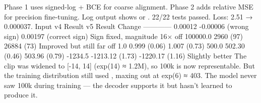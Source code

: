 {}Phase 1 uses signed-log + BCE for coarse alignment. Phase 2 adds relative MSE for precision fine-tuning. Log output shows \markdownRendererCodeSpan{[P1]} or \markdownRendererCodeSpan{[P2]}.\markdownRendererInterblockSeparator
{}\markdownRendererThematicBreak{}\markdownRendererInterblockSeparator
{}
\markdownRendererSectionEnd 
\markdownRendererSectionEnd \markdownRendererSectionBegin
{}\markdownRendererInterblockSeparator
{}\markdownRendererSectionBegin
{}\markdownRendererInterblockSeparator
{}22/22 tests passed. Loss: 2.51 → 0.000037.\markdownRendererParagraphSeparator
{}\markdownRendererPipe{} Input \markdownRendererPipe{} v4 Result \markdownRendererPipe{} v5 Result \markdownRendererPipe{} Change \markdownRendererPipe{}\markdownRendererSoftLineBreak
{}\markdownRendererPipe{}---\markdownRendererPipe{}---\markdownRendererPipe{}---\markdownRendererPipe{}---\markdownRendererPipe{}\markdownRendererSoftLineBreak
{}\markdownRendererPipe{} 0.00012 \markdownRendererPipe{} -0.00006 (wrong sign) \markdownRendererPipe{} 0.00197 (correct sign) \markdownRendererPipe{} Sign fixed, magnitude 16× off \markdownRendererPipe{}\markdownRendererSoftLineBreak
{}\markdownRendererPipe{} 100000.0 \markdownRendererPipe{} 2960 (97\markdownRendererPercentSign{}) \markdownRendererPipe{} 26884 (73\markdownRendererPercentSign{}) \markdownRendererPipe{} Improved but still far off \markdownRendererPipe{}\markdownRendererSoftLineBreak
{}\markdownRendererPipe{} 1.0 \markdownRendererPipe{} 0.999 (0.06\markdownRendererPercentSign{}) \markdownRendererPipe{} 1.007 (0.73\markdownRendererPercentSign{}) \markdownRendererPipe{}  \markdownRendererPipe{}\markdownRendererSoftLineBreak
{}\markdownRendererPipe{} 500.0 \markdownRendererPipe{} 502.30 (0.46\markdownRendererPercentSign{}) \markdownRendererPipe{} 503.96 (0.79\markdownRendererPercentSign{}) \markdownRendererPipe{}  \markdownRendererPipe{}\markdownRendererSoftLineBreak
{}\markdownRendererPipe{} -1234.5 \markdownRendererPipe{} -1213.12 (1.73\markdownRendererPercentSign{}) \markdownRendererPipe{} -1220.17 (1.16\markdownRendererPercentSign{}) \markdownRendererPipe{} Slightly better \markdownRendererPipe{}\markdownRendererInterblockSeparator
{}
\markdownRendererSectionEnd \markdownRendererSectionBegin
{}\markdownRendererInterblockSeparator
{} The clip was widened to [-14, 14] (exp(14) ≈ 1.2M), so 100k is now representable. But the training distribution still used , maxing out at exp(6) ≈ 403. The model never saw 100k during training — the decoder supports it but hasn't learned to produce it.\markdownRendererParagraphSeparator
